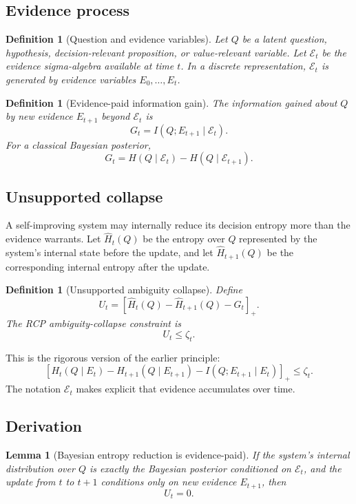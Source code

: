 \documentclass[11pt]{article}
\newtheorem{lemma}[theorem]{Lemma}
\newtheorem{definition}[theorem]{Definition}
\newcommand{\Ecal}{\mathcal{E}}
\newcommand{\1}{\mathbf{1}}
\begin{document}
\subsection{Evidence process}

\begin{definition}[Question and evidence variables]
Let \(Q\) be a latent question, hypothesis, decision-relevant proposition, or value-relevant variable. Let \(\Ecal_t\) be the evidence sigma-algebra available at time \(t\). In a discrete representation, \(\Ecal_t\) is generated by evidence variables \(E_0,\dots,E_t\).
\end{definition}

\begin{definition}[Evidence-paid information gain]
The information gained about \(Q\) by new evidence \(E_{t+1}\) beyond \(\Ecal_t\) is
\[
G_t=I(Q;E_{t+1}\mid\Ecal_t).
\]
For a classical Bayesian posterior,
\[
G_t
=
H(Q\mid\Ecal_t)-H(Q\mid\Ecal_{t+1}).
\]
\end{definition}

\subsection{Unsupported collapse}

A self-improving system may internally reduce its decision entropy more than the evidence warrants. Let \(\widehat H_t(Q)\) be the entropy over \(Q\) represented by the system's internal state before the update, and let \(\widehat H_{t+1}(Q)\) be the corresponding internal entropy after the update.

\begin{definition}[Unsupported ambiguity collapse]
Define
\[
U_t
=
\left[
\widehat H_t(Q)-\widehat H_{t+1}(Q)-G_t
\right]_+.
\]
The RCP ambiguity-collapse constraint is
\[
\boxed{U_t\le\zeta_t.}
\]
\end{definition}

This is the rigorous version of the earlier principle:
\[
\left[
H_t(Q\mid E_t)
-
H_{t+1}(Q\mid E_{t+1})
-
I(Q;E_{t+1}\mid E_t)
\right]_+
\le
\zeta_t.
\]
The notation \(\Ecal_t\) makes explicit that evidence accumulates over time.

\subsection{Derivation}

\begin{lemma}[Bayesian entropy reduction is evidence-paid]
If the system's internal distribution over \(Q\) is exactly the Bayesian posterior conditioned on \(\Ecal_t\), and the update from \(t\) to \(t+1\) conditions only on new evidence \(E_{t+1}\), then
\[
U_t=0.
\]
\end{lemma}
\end{document}
